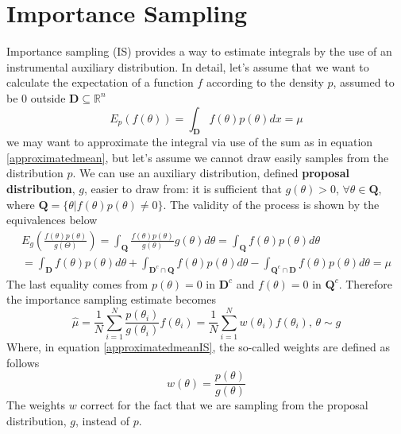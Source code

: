 \documentclass[12pt,mythesisstyle]{report}
\begin{document}
\section{Importance Sampling}\label{section:IS}
Importance sampling (IS) provides a way to estimate integrals by the use of an instrumental auxiliary distribution. In detail, let's assume that we want to calculate the expectation of a function $f$ according to the density $p$, assumed to be $0$ outside $\mathbf{D} \subseteq \mathbb{R}^n$
\begin{equation}\label{expectationis}
E_{p}(f(\theta))=\int_{\mathbf{D}} f(\theta) p(\theta) dx=\mu
\end{equation}
we may want to approximate the integral via use of the sum as in equation \eqref{approximatedmean}, but let's assume we cannot draw easily samples from the distribution $p$. We can use an auxiliary distribution, defined \textbf{proposal distribution}, $g$, easier to draw from: it is sufficient that $g(\theta)>0$,  $\forall \theta \in \mathbf{Q}$, where $\mathbf{Q}=\{\theta | f(\theta)p(\theta)\neq 0\}$. The validity of the process is shown by the equivalences below \cite{OwenIS}
\begin{equation}\label{equationISweights}
\begin{aligned}
E_{g}(\frac{f(\theta)p(\theta)}{g(\Theta)})=\int_{\mathbf{Q}} \frac{f(\theta)p(\theta)}{g(\theta)}g(\theta) d\theta=\int_{\mathbf{Q}} f(\theta)p(\theta) d\theta \\
=\int_{\mathbf{D}} f(\theta)p(\theta) d\theta + \int_{\mathbf{D}^c \cap \mathbf{Q}} f(\theta)p(\theta) d\theta -
\int_{\mathbf{Q}^c \cap \mathbf{D}} f(\theta)p(\theta) d\theta=\mu
\end{aligned}
\end{equation}
The last equality comes from $p(\theta)=0 \text{ in } \mathbf{D}^c$ and $f(\theta)=0 \text{ in } \mathbf{Q}^c$.
Therefore the importance sampling estimate becomes
\begin{equation}\label{approximatedmeanIS}
\hat{\mu}=\frac{1}{N}\sum_{i=1}^{N}\frac{p(\theta_{i})}{g(\theta_{i})}f(\theta_{i}) =\frac{1}{N}\sum_{i=1}^{N}w(\theta_{i})f(\theta_{i}) \text{, } \theta \sim g
\end{equation}
Where, in equation \eqref{approximatedmeanIS}, the so-called weights are defined as follows
\begin{equation}\label{weightseqn_f_on_g}
w(\theta)=\frac{p(\theta)}{g(\theta)}
\end{equation}
The weights $w$ correct for the fact that we are sampling from the proposal distribution, $g$, instead of $p$.
\end{document}
